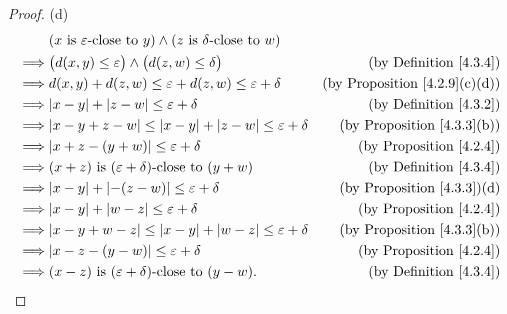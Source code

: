 \begin{proof}{(d)}
    \begin{align*}
                 & (x \text{ is \(\varepsilon\)-close to } y) \land (z \text{ is \(\delta\)-close to } w)                                             \\
        \implies & \big(d(x, y) \leq \varepsilon\big) \land \big(d(z, w) \leq \delta\big)                 & \text{(by Definition \ref{4.3.4})}        \\
        \implies & d(x, y) + d(z, w) \leq \varepsilon + d(z, w) \leq \varepsilon + \delta                 & \text{(by Proposition \ref{4.2.9}(c)(d))} \\
        \implies & \abs{x - y} + \abs{z - w} \leq \varepsilon + \delta                                    & \text{(by Definition \ref{4.3.2})}        \\
        \implies & \abs{x - y + z - w} \leq \abs{x - y} + \abs{z - w} \leq \varepsilon + \delta           & \text{(by Proposition \ref{4.3.3}(b))}    \\
        \implies & \abs{x + z - (y + w)} \leq \varepsilon + \delta                                        & \text{(by Proposition \ref{4.2.4})}       \\
        \implies & (x + z) \text{ is \((\varepsilon + \delta)\)-close to } (y + w)                        & \text{(by Definition \ref{4.3.4})}        \\
        \implies & \abs{x - y} + \abs{-(z - w)} \leq \varepsilon + \delta                                 & \text{(by Proposition \ref{4.3.3})(d)}    \\
        \implies & \abs{x - y} + \abs{w - z} \leq \varepsilon + \delta                                    & \text{(by Proposition \ref{4.2.4})}       \\
        \implies & \abs{x - y + w - z} \leq \abs{x - y} + \abs{w - z} \leq \varepsilon + \delta           & \text{(by Proposition \ref{4.3.3}(b))}    \\
        \implies & \abs{x - z - (y - w)} \leq \varepsilon + \delta                                        & \text{(by Proposition \ref{4.2.4})}       \\
        \implies & (x - z) \text{ is \((\varepsilon + \delta)\)-close to } (y - w).                       & \text{(by Definition \ref{4.3.4})}
    \end{align*}
\end{proof}

